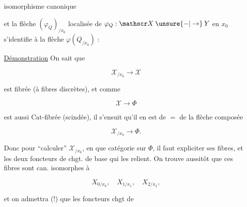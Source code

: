 isomorphisme canonique


et la flèche $(\varphi_Q)_{/x_0}$ localisée de $\varphi_Q:\mathscr X\mathbin{\unsure{-|\to}}Y$ en  $x_0$ s'identifie à la flèche $\varphi(Q_{/x_0})$ :


\uline{Démonstration}  On sait que

\[
\mathscr X_{/x_0}\longrightarrow\mathscr X
\]

est fibrée  (à fibres discrètes), et comme

\[
\mathscr X\longrightarrow\Phi
\]

est aussi $\mathrm{Cat}$-fibrée (scindée), il s'ensuit qu'il en est de $=$ de la flèche composée

\[
\mathscr X_{/x_0}\longrightarrow\Phi .
\]

Donc  \unsure{,} pour ``calculer'' $\mathscr X_{/x_0}$, en  que catégorie sur $\Phi$, il faut expliciter ses  fibres, et les deux foncteurs de chgt. de base qui les relient. On trouve aussitôt que ces fibres sont can. isomorphes à

\[
X_{0/x_0},\quad X_{1/x_1},\quad X_{2/x_2},
\]

et on admettra (!) que les foncteurs chgt de
